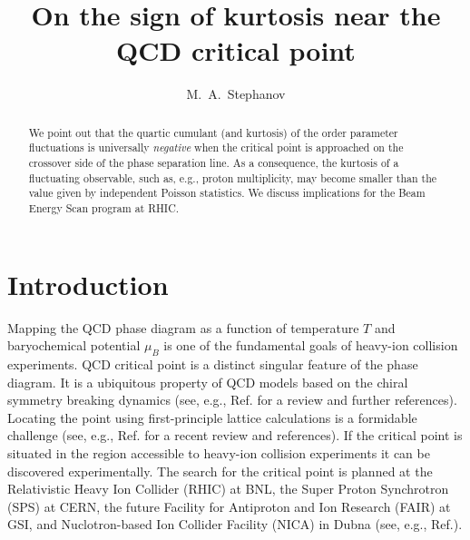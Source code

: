 \documentclass[prl,twocolumn,nofootinbib]{revtex4}
\begin{document}
\title{On the sign of kurtosis near the QCD critical point}

\author{M.~A.~Stephanov}

\begin{abstract}
  We point out that the quartic cumulant (and kurtosis) of the
  order parameter fluctuations is universally {\em negative} when the critical
  point is approached on the crossover side of the phase separation
  line. As a consequence, the kurtosis of a
  fluctuating observable, such as, e.g., proton multiplicity, may
  become smaller than the value given by independent Poisson
  statistics. We discuss implications for the Beam Energy Scan program
  at RHIC.
\end{abstract}

\maketitle

\section{Introduction}
\label{sec:intro}



Mapping the QCD phase diagram as a function of temperature $T$ and
baryochemical potential $\mu_B$ is one of the fundamental goals of
heavy-ion collision experiments. QCD critical point is a distinct
singular feature of the phase diagram. It is a ubiquitous property of
QCD models based on the chiral symmetry breaking
dynamics %
(see, e.g.,
 Ref.\cite{Stephanov:2004wx} for a review and further 
references). Locating
the point using first-principle lattice calculations is a formidable
challenge %
(see, e.g., Ref.\cite{deForcrand:2010ys} 
for a recent review and references).  
%
If the critical point is situated in the
region accessible to heavy-ion collision experiments it can be
discovered experimentally. The search for the critical point is
planned at the Relativistic Heavy Ion Collider (RHIC) at BNL, the
Super Proton Synchrotron (SPS) at CERN, the future Facility for
Antiproton and Ion Research (FAIR) at GSI, and Nuclotron-based Ion
Collider Facility (NICA) in
Dubna (see, e.g., Ref.\cite{Mohanty:2009vb}).
\end{document}
